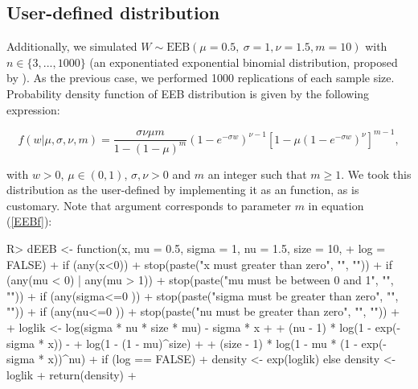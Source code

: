 \documentclass[nojss]{jss}
\begin{document}
\subsection{User-defined distribution}
Additionally, we simulated $W \sim \text{EEB}(\mu=0.5,\: \sigma=1, \nu=1.5, m=10)$ with $n \in \lbrace 3,...,1000 \rbrace$ (an exponentiated exponential binomial distribution, proposed by \cite{Bakouch2012}). As the previous case, we performed 1000 replications of each sample size. Probability density function of EEB distribution is given by the following expression:

\begin{equation} \label{EEBf}
  f(w|\mu, \sigma, \nu, m) = \frac{\sigma\nu\mu m}{1-(1-\mu)^m} \left(1 - e^{-\sigma w} \right)^{\nu-1} \left[ 1 - \mu\left(1 - e^{-\sigma w} \right)^\nu \right]^{m-1},
\end{equation}

with $w>0$, $\mu \in (0,1)$, $\sigma, \nu>0$ and $m$ an integer such that $m \geq 1$. We took this distribution as the user-defined by implementing it as an  function, as is customary. Note that argument  corresponds to parameter $m$ in equation (\ref{EEBf}):

\begin{Schunk}
\begin{Sinput}
R> dEEB <- function(x, mu = 0.5, sigma = 1, nu = 1.5, size = 10,
+                   log = FALSE){
+    if (any(x<0))
+      stop(paste("x must greater than zero", "\n", ""))
+    if (any(mu < 0) | any(mu > 1))
+      stop(paste("mu must be between 0 and 1", "\n", ""))
+    if (any(sigma<=0 ))
+      stop(paste("sigma must be greater than zero", "\n", ""))
+    if (any(nu<=0 ))
+      stop(paste("nu must be greater than zero", "\n", ""))
+  
+    loglik <- log(sigma * nu * size *  mu) - sigma * x +
+              (nu - 1) * log(1 - exp(-sigma * x)) -
+              log(1 - (1 - mu)^size) +
+              (size - 1) * log(1 - mu * (1 - exp(-sigma * x))^nu)
+    if (log == FALSE)
+      density <- exp(loglik) else density <- loglik
+    return(density)
+  }
\end{Sinput}
\end{Schunk}
\end{document}
